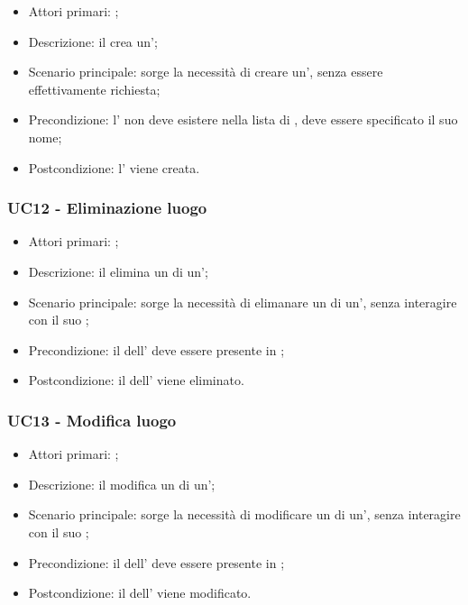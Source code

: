 \documentclass[../analisi-dei-requisiti]{subfiles}
\begin{document}
\begin{itemize}
\item Attori primari: ;
\item Descrizione: il  crea un';
\item Scenario principale: sorge la necessità di creare un', senza essere effettivamente richiesta; 
\item Precondizione: l' non deve esistere nella lista di , deve essere specificato il suo nome;
\item Postcondizione: l' viene creata.

\end{itemize}

\subsubsection{UC12 - Eliminazione luogo}
\label{subsub:UC12}

\begin{itemize}
\item Attori primari: ;
\item Descrizione: il  elimina un  di un';
\item Scenario principale: sorge la necessità di elimanare un  di un', senza interagire con il suo ; 
\item Precondizione: il  dell' deve essere presente in ;
\item Postcondizione: il  dell' viene eliminato.

\end{itemize}

\subsubsection{UC13 - Modifica luogo}
\label{subsub:UC13}

\begin{itemize}
\item Attori primari: ;
\item Descrizione: il  modifica un  di un';
\item Scenario principale: sorge la necessità di modificare un  di un', senza interagire con il suo ; 
\item Precondizione: il  dell' deve essere presente in ;
\item Postcondizione: il  dell' viene modificato.

\end{itemize}
\end{document}

